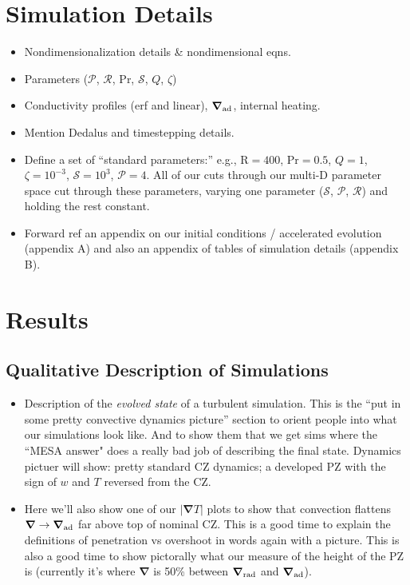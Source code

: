 \documentclass[12pt]{article}
\renewcommand{\vec}[1]{\boldsymbol{#1}}
\newcommand{\grad}{\vec{\nabla}}
\begin{document}
\section{Simulation Details}
\begin{itemize}
\item Nondimensionalization details \& nondimensional eqns.
\item Parameters ($\mathcal{P}$, $\mathcal{R}$, Pr, $\mathcal{S}$, $Q$, $\zeta$)
\item Conductivity profiles (erf and linear), $\grad_{\rm{ad}}$, internal heating.
\item Mention Dedalus \citep{burns_etal_2020} and timestepping details.
\item Define a set of ``standard parameters:'' e.g., $\mathrm{R} = 400$, $\mathrm{Pr} = 0.5$, $Q = 1$, $\zeta = 10^{-3}$, $\mathcal{S} = 10^3$, $\mathcal{P} = 4$.
All of our cuts through our multi-D parameter space cut through these parameters, varying one parameter ($\mathcal{S}$, $\mathcal{P}$, $\mathcal{R}$) and holding the rest constant.
\item Forward ref an appendix on our initial conditions / accelerated evolution (appendix A) and also an appendix of tables of simulation details (appendix B).
\end{itemize}

\section{Results}

\subsection{Qualitative Description of Simulations}
\begin{itemize}
\item Description of the \emph{evolved state} of a turbulent simulation.
This is the ``put in some pretty convective dynamics picture'' section to orient people into what our simulations look like.
And to show them that we get sims where the ``MESA answer" does a really bad job of describing the final state.
Dynamics pictuer will show: pretty standard CZ dynamics; a developed PZ with the sign of $w$ and $T$ reversed from the CZ.
\item Here we'll also show one of our $|\grad T|$ plots to show that convection flattens $\grad \rightarrow \grad_{\rm{ad}}$ far above top of nominal CZ.
This is a good time to explain the definitions of penetration vs overshoot in words again with a picture.
This is also a good time to show pictorally what our measure of the height of the PZ is (currently it's where $\grad$ is 50\% between $\grad_{\rm{rad}}$ and $\grad_{\rm{ad}}$).
\end{itemize}
\end{document}
